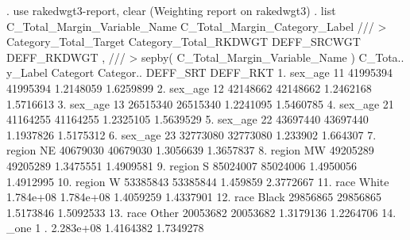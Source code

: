 . use rakedwgt3-report, clear
(Weighting report on rakedwgt3)
{\smallskip}
. list C_Total_Margin_Variable_Name C_Total_Margin_Category_Label ///
>         Category_Total_Target Category_Total_RKDWGT DEFF_SRCWGT DEFF_RKDWGT , ///
>         sepby( C_Total_Margin_Variable_Name )
{\smallskip}
     {\TLC}
     {\VBAR} C_Tota..   {\tytilde}y_Label   Categor{\tytilde}t   Categor..   DEFF_SR{\tytilde}T   DEFF_RK{\tytilde}T {\VBAR}
     {\LFTT}
  1. {\VBAR}  sex_age         11    41995394    41995394   1.2148059   1.6259899 {\VBAR}
  2. {\VBAR}  sex_age         12    42148662    42148662   1.2462168   1.5716613 {\VBAR}
  3. {\VBAR}  sex_age         13    26515340    26515340   1.2241095   1.5460785 {\VBAR}
  4. {\VBAR}  sex_age         21    41164255    41164255   1.2325105   1.5639529 {\VBAR}
  5. {\VBAR}  sex_age         22    43697440    43697440   1.1937826   1.5175312 {\VBAR}
  6. {\VBAR}  sex_age         23    32773080    32773080    1.233902    1.664307 {\VBAR}
     {\LFTT}
  7. {\VBAR}   region         NE    40679030    40679030   1.3056639   1.3657837 {\VBAR}
  8. {\VBAR}   region         MW    49205289    49205289   1.3475551   1.4909581 {\VBAR}
  9. {\VBAR}   region          S    85024007    85024006   1.4950056   1.4912995 {\VBAR}
 10. {\VBAR}   region          W    53385843    53385844    1.459859   2.3772667 {\VBAR}
     {\LFTT}
 11. {\VBAR}     race      White   1.784e+08   1.784e+08   1.4059259   1.4337901 {\VBAR}
 12. {\VBAR}     race      Black    29856865    29856865   1.5173846   1.5092533 {\VBAR}
 13. {\VBAR}     race      Other    20053682    20053682   1.3179136   1.2264706 {\VBAR}
     {\LFTT}
 14. {\VBAR}     _one          1           .   2.283e+08   1.4164382   1.7349278 {\VBAR}
     {\BLC}
